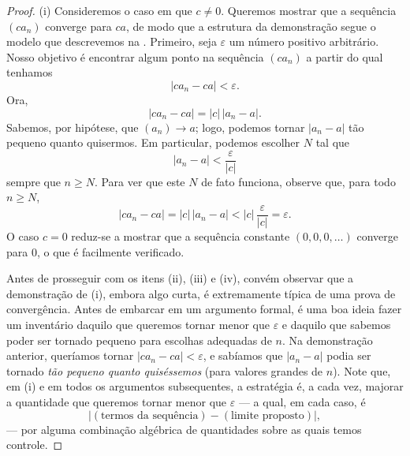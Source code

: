 \begin{proof}
(i) Consideremos o caso em que $c \neq 0$. Queremos mostrar que a sequência $(ca_n)$ converge para $ca$, de modo que a estrutura da demonstração segue o modelo que descrevemos na . Primeiro, seja $\varepsilon$ um número positivo arbitrário. Nosso objetivo é encontrar algum ponto na sequência $(ca_n)$ a partir do qual tenhamos
\[
|ca_n - ca| < \varepsilon.
\]
Ora,
\[
|ca_n - ca| = |c|\, |a_n - a|.
\]
Sabemos, por hipótese, que $(a_n) \to a$; logo, podemos tornar $|a_n - a|$ tão pequeno quanto quisermos. Em particular, podemos escolher $N$ tal que
\[
|a_n - a| < \frac{\varepsilon}{|c|}
\]
sempre que $n \geq N$. Para ver que este $N$ de fato funciona, observe que, para todo $n \geq N$,
\[
|ca_n - ca| = |c|\, |a_n - a| < |c| \, \frac{\varepsilon}{|c|} = \varepsilon.
\]
O caso $c = 0$ reduz-se a mostrar que a sequência constante $(0, 0, 0, \dots)$ converge para $0$, o que é facilmente verificado.

Antes de prosseguir com os itens (ii), (iii) e (iv), convém observar que a demonstração de (i), embora algo curta, é extremamente típica de uma prova de convergência. Antes de embarcar em um argumento formal, é uma boa ideia fazer um inventário daquilo que queremos tornar menor que $\varepsilon$ e daquilo que sabemos poder ser tornado pequeno para escolhas adequadas de $n$. Na demonstração anterior, queríamos tornar $|ca_n - ca| < \varepsilon$, e sabíamos que $|a_n - a|$ podia ser tornado \textit{tão pequeno quanto quiséssemos} (para valores grandes de $n$). Note que, em (i) e em todos os argumentos subsequentes, a estratégia é, a cada vez, majorar a quantidade que queremos tornar menor que $\varepsilon$ --- a qual, em cada caso, é
\[
|(\text{termos da sequência}) - (\text{limite proposto})|,
\]
--- por alguma combinação algébrica de quantidades sobre as quais temos controle.


\end{proof}

